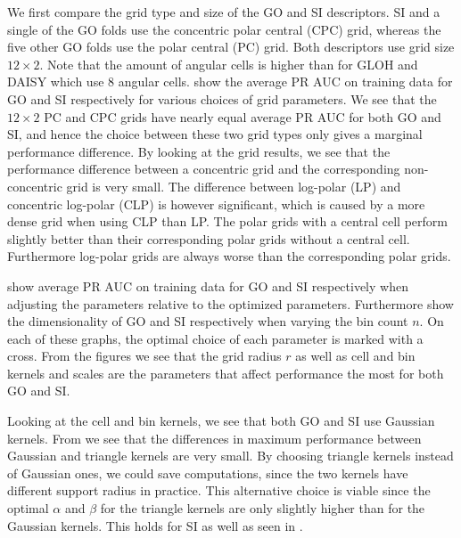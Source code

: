 \documentclass[thesis.tex]{subfiles}
\begin{document}
We first compare the grid type and size of the GO and SI descriptors. SI and a single of the GO folds use the concentric polar central (CPC) grid, whereas the five other GO folds use the polar central (PC) grid. Both descriptors use grid size $12 \times 2$. Note that the amount of angular cells is higher than for GLOH and DAISY which use 8 angular cells.  show the average PR AUC on training data for GO and SI respectively for various choices of grid parameters. We see that the $12\times2$ PC and CPC grids have nearly equal average PR AUC for both GO and SI, and hence the choice between these two grid types only gives a marginal performance difference. By looking at the grid results, we see that the performance difference between a concentric grid and the corresponding non-concentric grid is very small. The difference between log-polar (LP) and concentric log-polar (CLP) is however significant, which is caused by a more dense grid when using CLP than LP.
The polar grids with a central cell perform slightly better than their corresponding polar grids without a central cell. Furthermore log-polar grids are always worse than the corresponding polar grids.

 show average PR AUC on training data for GO and SI respectively when adjusting the parameters relative to the optimized parameters. Furthermore  show the dimensionality of GO and SI respectively when varying the bin count $n$. On each of these graphs, the optimal choice of each parameter is marked with a cross. From the figures we see that the grid radius $r$ as well as cell and bin kernels and scales are the parameters that affect performance the most for both GO and SI.


Looking at the cell and bin kernels, we see that both GO and SI use Gaussian kernels. From  we see that the differences in maximum performance between Gaussian and triangle kernels are very small. By choosing triangle kernels instead of Gaussian ones, we could save computations, since the two kernels have different support radius in practice. This alternative choice is viable since the optimal $\alpha$ and $\beta$ for the triangle kernels are only slightly higher than for the Gaussian kernels.
This holds for SI as well as seen in .
\end{document}
